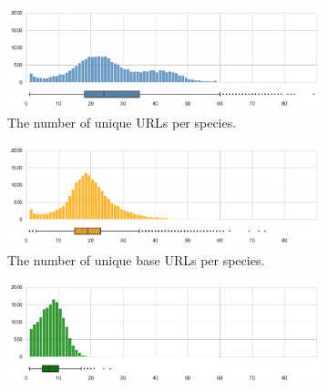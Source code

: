 \documentclass[a4paper, 12pt, oneside]{book} %
\begin{document}

\begin{figure} [htpb]
     \centering
     \begin{subfigure}[b]{1\textwidth}
         \centering
         \includegraphics[width=\textwidth]{figures/URL_distribution_1.pdf}
         \caption{The number of unique URLs per species.}
         \label{fig:URL_distribution_1}
     \end{subfigure}
     \vfill
     \begin{subfigure}[b]{1\textwidth}
         \centering
         \includegraphics[width=\textwidth]{figures/URL_distribution_2.pdf}
         \caption{The number of unique base URLs per species.}
         \label{fig:URL_distribution_2}
     \end{subfigure}
     \vfill
     \begin{subfigure}[b]{1\textwidth}
         \centering
         \includegraphics[width=\textwidth]{figures/URL_distribution_3.pdf}

\end{subfigure}
\end{figure}
\end{document}
